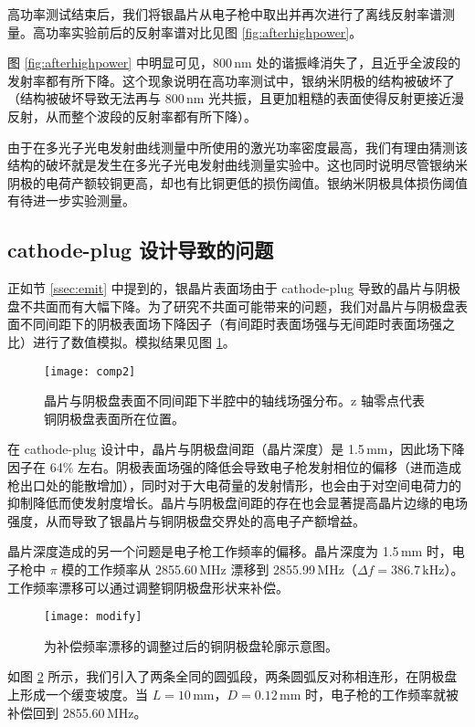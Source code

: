高功率测试结束后，我们将银晶片从电子枪中取出并再次进行了离线反射率谱测量。高功率实验前后的反射率谱对比见图 \ref{fig:afterhighpower}。

图 \ref{fig:afterhighpower} 中明显可见，800\,nm 处的谐振峰消失了，且近乎全波段的发射率都有所下降。这个现象说明在高功率测试中，银纳米阴极的结构被破坏了（结构被破坏导致无法再与 800\,nm 光共振，且更加粗糙的表面使得反射更接近漫反射，从而整个波段的反射率都有所下降）。

由于在多光子光电发射曲线测量中所使用的激光功率密度最高，我们有理由猜测该结构的破坏就是发生在多光子光电发射曲线测量实验中。这也同时说明尽管银纳米阴极的电荷产额较铜更高，却也有比铜更低的损伤阈值。银纳米阴极具体损伤阈值有待进一步实验测量。

\subsection{cathode-plug 设计导致的问题}
正如节 \ref{ssec:emit} 中提到的，银晶片表面场由于 cathode-plug 导致的晶片与阴极盘不共面而有大幅下降。为了研究不共面可能带来的问题，我们对晶片与阴极盘表面不同间距下的阴极表面场下降因子（有间距时表面场强与无间距时表面场强之比）进行了数值模拟。模拟结果见图 \ref{fig:comp}。
\begin{figure}[htbp]
\begin{center}
\texttt{[image: comp2]}
\caption{\label{fig:comp}
晶片与阴极盘表面不同间距下半腔中的轴线场强分布。z 轴零点代表铜阴极盘表面所在位置。}
\end{center}
\end{figure}

在 cathode-plug 设计中，晶片与阴极盘间距（晶片深度）是 1.5\,mm，因此场下降因子在 64\% 左右。阴极表面场强的降低会导致电子枪发射相位的偏移（进而造成枪出口处的能散增加），同时对于大电荷量的发射情形，也会由于对空间电荷力的抑制降低而使发射度增长。晶片与阴极盘间距的存在也会显著提高晶片边缘的电场强度，从而导致了银晶片与铜阴极盘交界处的高电子产额增益。

晶片深度造成的另一个问题是电子枪工作频率的偏移。晶片深度为 1.5\,mm 时，电子枪中 $\pi$ 模的工作频率从 2855.60\,MHz 漂移到 2855.99\,MHz（$\Delta f=386.7\,\text{kHz}$）。工作频率漂移可以通过调整铜阴极盘形状来补偿。
\begin{figure}[htbp]
\begin{center}
\texttt{[image: modify]}
\caption{\label{fig:mod} 为补偿频率漂移的调整过后的铜阴极盘轮廓示意图。}
\end{center}
\end{figure}
如图 \ref{fig:mod} 所示，我们引入了两条全同的圆弧段，两条圆弧反对称相连形，在阴极盘上形成一个缓变坡度。当 $L=10\,\text{mm}$，$D=0.12\,\text{mm}$ 时，电子枪的工作频率就被补偿回到 2855.60\,MHz。


